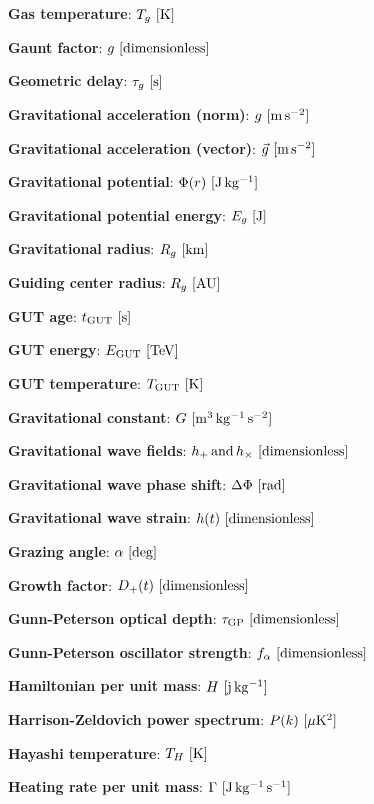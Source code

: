 \documentclass[a4paper,10pt]{article}
\begin{document}
{\noindent}\textbf{Gas temperature}: $T_g ~ [{\rm K}]$

{\noindent}\textbf{Gaunt factor}: $g ~ [{\rm dimensionless}]$

{\noindent}\textbf{Geometric delay}: $\tau_g ~ [{\rm s}]$

{\noindent}\textbf{Gravitational acceleration (norm)}: $g ~ [{\rm m\,s^{-2}}]$

{\noindent}\textbf{Gravitational acceleration (vector)}: $\vec{g} ~ [{\rm m\,s^{-2}}]$

{\noindent}\textbf{Gravitational potential}: $\Phi(r) ~ [{\rm J\,kg^{-1}}]$

{\noindent}\textbf{Gravitational potential energy}: $E_g ~ [{\rm J}]$

{\noindent}\textbf{Gravitational radius}: $R_g ~ [{\rm km}]$

{\noindent}\textbf{Guiding center radius}: $R_g ~ [{\rm AU}]$

{\noindent}\textbf{GUT age}: $t_\mathrm{GUT} ~ [{\rm s}]$

{\noindent}\textbf{GUT energy}: $E_\mathrm{GUT} ~ [{\rm TeV}]$

{\noindent}\textbf{GUT temperature}: $T_\mathrm{GUT} ~ [{\rm K}]$

{\noindent}\textbf{Gravitational constant}: $G ~ [{\rm m^3\,kg^{-1}\,s^{-2}}]$

{\noindent}\textbf{Gravitational wave fields}: $h_+\,{\rm and}\,h_\times ~
[{\rm dimensionless}]$

{\noindent}\textbf{Gravitational wave phase shift}: $\Delta\Phi ~ [{\rm rad}]$

{\noindent}\textbf{Gravitational wave strain}: $h(t) ~ [{\rm dimensionless}]$

{\noindent}\textbf{Grazing angle}: $\alpha ~ [{\rm deg}]$

{\noindent}\textbf{Growth factor}: $D_+(t) ~ [{\rm dimensionless}]$

{\noindent}\textbf{Gunn-Peterson optical depth}: $\tau_\mathrm{GP} ~ [{\rm dimensionless}]$

{\noindent}\textbf{Gunn-Peterson oscillator strength}: $f_\alpha ~ [{\rm dimensionless}]$

{\noindent}\textbf{Hamiltonian per unit mass}: $H ~ [{\rm j\,kg^{-1}}]$

{\noindent}\textbf{Harrison-Zeldovich power spectrum}: $P(k) ~ [{\rm \mu K^2}]$

{\noindent}\textbf{Hayashi temperature}: $T_H ~ [{\rm K}]$

{\noindent}\textbf{Heating rate per unit mass}: $\Gamma ~ [{\rm J\,kg^{-1}\,s^{-1}}]$
\end{document}
